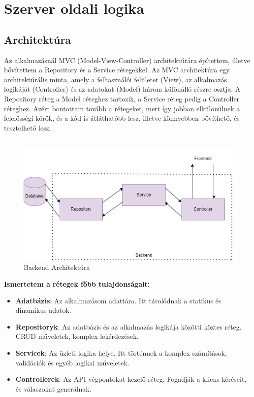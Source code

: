 \section*{Szerver oldali logika}
\subsection*{Architektúra}
Az alkalmazásnál MVC (Model-View-Controller) architektúrára építettem, illetve
bővítettem a Repository és a Service rétegekkel. Az MVC architektúra egy
architektúrális minta, amely a felhasználói felületet (View), az alkalmazás
logikáját (Controller) és az adatokat (Model) három különálló részre osztja.
A Repository réteg a Model réteghez tartozik, a Service réteg pedig a Controller réteghez.
Azért bontottam tovább a rétegeket, mert így jobban elkülönülnek a felelősségi körök,
és a kód is átláthatóbb lesz, illetve könnyebben bővíthető, és tesztelhető lesz.
\\
\\
\begin{figure}[H]
    \centering
    \includegraphics[width=14.0truecm]{images/Backend_architecture.png}
    \caption{Backend Architektúra}
    \label{fig:backend_architecture}
\end{figure}
\textbf{Ismertetem a rétegek főbb tulajdonságait:}
\begin{itemize}
    \item \textbf{Adatbázis}: Az alkalmazásom adattára. Itt tárolódnak a statikus és dinamikus adatok.
    \item \textbf{Repositoryk}: Az adatbázis és az alkalmazás logikája közötti köztes réteg. CRUD műveletek, komplex lekérdezések.
    \item \textbf{Servicek}: Az üzleti logika helye. Itt történnek a komplex számítások, validációk és egyéb logikai műveletek.
    \item \textbf{Controllerek}: Az API végpontokat kezelő réteg. Fogadják a kliens kéréseit, és válaszokat generálnak.
\end{itemize}

